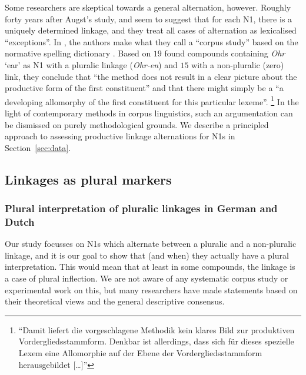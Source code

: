 Some researchers are skeptical towards a general alternation, however.
Roughly forty years after Augst's study, \textcite[31]{NeefBorgwaldt2012} and \textcite[46]{Neef2015} seem to suggest that for each N1, there is a uniquely determined linkage, and they treat all cases of alternation as lexicalised ``exceptions''.
In \textcite[42]{NeefBorgwaldt2012}, the authors make what they call a ``corpus study'' based on the normative spelling dictionary \textcite{Duden2006}.
Based on $19$ found compounds containing \textit{Ohr} `ear' as N1 with a pluralic linkage (\textit{Ohr-en}) and $15$ with a non-pluralic (zero) link, they conclude that ``the method does not result in a clear picture about the productive form of the first constituent'' and that there might simply be a ``a developing allomorphy of the first constituent for this particular lexeme''.%
\footnote{``Damit liefert die vorgeschlagene Methodik kein klares Bild zur produktiven Vordergliedsstammform.
Denkbar ist allerdings, dass sich für dieses spezielle Lexem eine Allomorphie auf der Ebene der Vordergliedsstammform herausgebildet [\ldots]''}
In the light of contemporary methods in corpus linguistics, such an argumentation can be dismissed on purely methodological grounds.
We describe a principled approach to assessing productive linkage alternations for N1s in Section~\ref{sec:data}.


\subsection{Linkages as plural markers}
\label{sec:linkagesaspluralmarkers}

\subsubsection{Plural interpretation of pluralic linkages in German and Dutch}

Our study focusses on N1s which alternate between a pluralic and a non-pluralic linkage, and it is our goal to show that (and when) they actually have a plural interpretation.
This would mean that at least in some compounds, the linkage is a case of plural inflection.
We are not aware of any systematic corpus study or experimental work on this, but many researchers have made statements based on their theoretical views and the general descriptive consensus.

